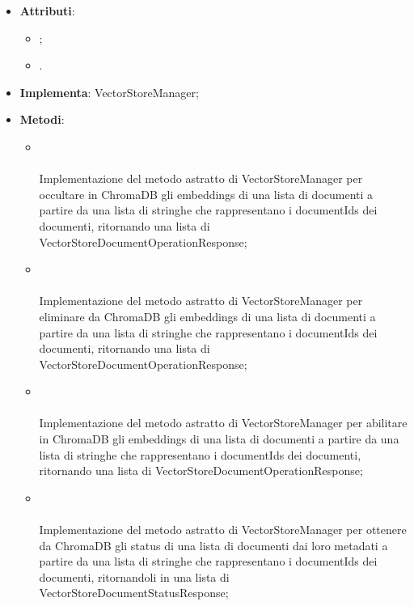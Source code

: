 \documentclass[10pt, a4paper]{article}
\begin{document}
\label{VectorStoreChromaDBManagerDettaglio}
\begin{itemize}
    \item \textbf{Attributi}:
    \begin{itemize}
        \item {}; 
        \item {}.
    \end{itemize}
    \item \textbf{Implementa}: VectorStoreManager;
    \item \textbf{Metodi}:
    \begin{itemize}
        \item {}\\ \\
        Implementazione del metodo astratto di VectorStoreManager per occultare in ChromaDB gli embeddings di una lista di documenti a partire da una lista di stringhe che rappresentano i documentIds dei documenti, ritornando una lista di VectorStoreDocumentOperationResponse;

        \item {}\\ \\
        Implementazione del metodo astratto di VectorStoreManager per eliminare da ChromaDB gli embeddings di una lista di documenti a partire da una lista di stringhe che rappresentano i documentIds dei documenti, ritornando una lista di VectorStoreDocumentOperationResponse;

        \item {}\\ \\
        Implementazione del metodo astratto di VectorStoreManager per abilitare in ChromaDB gli embeddings di una lista di documenti a partire da una lista di stringhe che rappresentano i documentIds dei documenti, ritornando una lista di VectorStoreDocumentOperationResponse;

        \item {}\\ \\
        Implementazione del metodo astratto di VectorStoreManager per ottenere da ChromaDB gli status di una lista di documenti dai loro metadati a partire da una lista di stringhe che rappresentano i documentIds dei documenti, ritornandoli in una lista di VectorStoreDocumentStatusResponse;      


\end{itemize}
\end{itemize}
\end{document}
